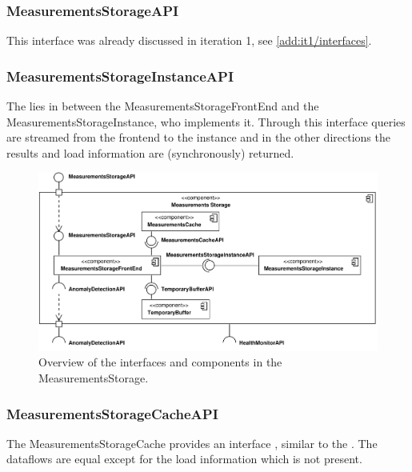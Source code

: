 \subsubsection{MeasurementsStorageAPI}

\npar This interface was already discussed in iteration 1, see
\ref{add:it1/interfaces}.

\subsubsection{MeasurementsStorageInstanceAPI}

\npar The  lies in between the
MeasurementsStorageFrontEnd and the MeasurementsStorageInstance, who implements
it. Through this interface queries are streamed from the frontend to the
instance and in the other directions the results and load information are
(synchronously) returned.

\begin{figure}[H]
	\begin{centering}
		\includegraphics[width=\textwidth]{figs/add-it4-interfaces.pdf}
		\caption{Overview of the interfaces and components in the
		MeasurementsStorage.}
		\label{fig:it4/interfaces}
	\end{centering}
\end{figure}

\subsubsection{MeasurementsStorageCacheAPI}

\npar The MeasurementsStorageCache provides an interface
, similar to the
. The dataflows are equal except for
the load information which is not present.

